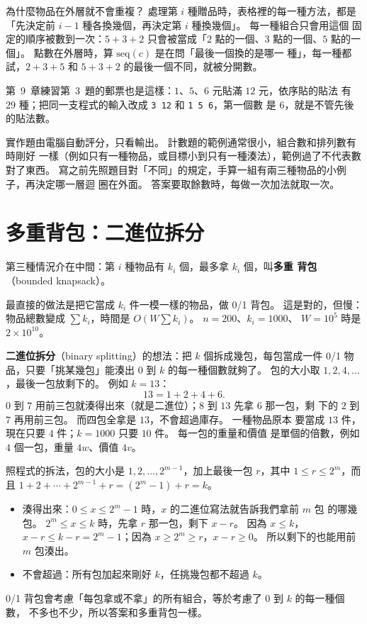 為什麼物品在外層就不會重複？ 處理第 $i$ 種贈品時，表格裡的每一種方法，都是
「先決定前 $i - 1$ 種各換幾個，再決定第 $i$ 種換幾個」。 每一種組合只會用這個
固定的順序被數到一次：$5 + 3 + 2$ 只會被當成「$2$ 點的一個、$3$ 點的一個、$5$
點的一個」。 點數在外層時，算 $\mathrm{seq}(c)$ 是在問「最後一個換的是哪一
種」，每一種都試，$2 + 3 + 5$ 和 $5 + 3 + 2$ 的最後一個不同，就被分開數。

第~9~章練習第~3~題的郵票也是這樣：$1$、$5$、$6$ 元貼滿 $12$ 元，依序貼的貼法
有 $29$ 種；把同一支程式的輸入改成 \texttt{3 12} 和 \texttt{1 5 6}，第一個數
是 $6$，就是不管先後的貼法數。

\begin{apcsnote}
實作題由電腦自動評分，只看輸出。 計數題的範例通常很小，組合數和排列數有時剛好
一樣（例如只有一種物品，或目標小到只有一種湊法），範例過了不代表數對了東西。
寫之前先照題目對「不同」的規定，手算一組有兩三種物品的小例子，再決定哪一層迴
圈在外面。 答案要取餘數時，每做一次加法就取一次。
\end{apcsnote}

\section{多重背包：二進位拆分}
\label{sec:knap-bounded}

第三種情況介在中間：第 $i$ 種物品有 $k_i$ 個，最多拿 $k_i$ 個，叫\textbf{多重
背包}（bounded knapsack）。

最直接的做法是把它當成 $k_i$ 件一模一樣的物品，做 0/1 背包。 這是對的，但慢：
物品總數變成 $\sum k_i$，時間是 $O(W \sum k_i)$。 $n = 200$、$k_i = 1000$、
$W = 10^5$ 時是 $2 \times 10^{10}$。

\textbf{二進位拆分}（binary splitting）的想法：把 $k$ 個拆成幾包，每包當成一件
0/1 物品，只要「挑某幾包」能湊出 $0$ 到 $k$ 的每一種個數就夠了。 包的大小取
$1, 2, 4, \ldots$，最後一包放剩下的。 例如 $k = 13$：
\[
13 = 1 + 2 + 4 + 6.
\]
$0$ 到 $7$ 用前三包就湊得出來（就是二進位）；$8$ 到 $13$ 先拿 $6$ 那一包，剩
下的 $2$ 到 $7$ 再用前三包。 而四包全拿是 $13$，不會超過庫存。 一種物品原本
要當成 $13$ 件，現在只要 $4$ 件；$k = 1000$ 只要 $10$ 件。 每一包的重量和價值
是單個的倍數，例如 $4$ 個一包，重量 $4w$、價值 $4v$。

\begin{whybox}[拆出來的包剛好湊得出 $0$ 到 $k$]
照程式的拆法，包的大小是 $1, 2, \ldots, 2^{m-1}$，加上最後一包 $r$，其中
$1 \le r \le 2^m$，而且 $1 + 2 + \cdots + 2^{m-1} + r = (2^m - 1) + r = k$。

\begin{itemize}
\item 湊得出來：$0 \le x \le 2^m - 1$ 時，$x$ 的二進位寫法就告訴我們拿前 $m$ 包
的哪幾包。 $2^m \le x \le k$ 時，先拿 $r$ 那一包，剩下 $x - r$。 因為
$x \le k$，$x - r \le k - r = 2^m - 1$；因為 $x \ge 2^m \ge r$，$x - r \ge 0$。
所以剩下的也能用前 $m$ 包湊出。
\item 不會超過：所有包加起來剛好 $k$，任挑幾包都不超過 $k$。
\end{itemize}

0/1 背包會考慮「每包拿或不拿」的所有組合，等於考慮了 $0$ 到 $k$ 的每一種個數，
不多也不少，所以答案和多重背包一樣。
\end{whybox}

